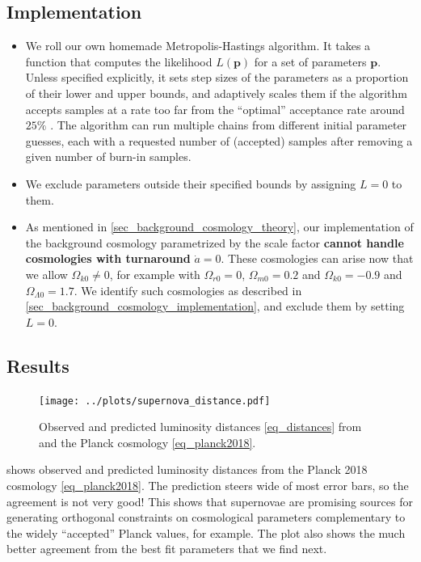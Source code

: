 \documentclass[10pt,a4paper]{article}
\begin{document}
\subsection{Implementation}

\begin{itemize}
	\item We roll our own homemade Metropolis-Hastings algorithm.
	      It takes a function that computes the likelihood $L(\mathbf{p})$ for a set of parameters $\mathbf{p}$.
	      Unless specified explicitly, it sets step sizes of the parameters as a proportion of their lower and upper bounds,
		  and adaptively scales them if the algorithm accepts samples at a rate too far from the ``optimal'' acceptance rate around $25\%$ \cite{gelmanWeakConvergenceOptimal1997}.
		  The algorithm can run multiple chains from different initial parameter guesses,
		  each with a requested number of (accepted) samples after removing a given number of burn-in samples.
	\item We exclude parameters outside their specified bounds by assigning $L=0$ to them.
	\item As mentioned in \cref{sec_background_cosmology_theory},
	      our implementation of the background cosmology parametrized by the scale factor
	      \textbf{cannot handle cosmologies with turnaround} $\dot{a} = 0$.
	      These cosmologies can arise now that we allow $\Omega_{k0} \neq 0$,
	      for example with $\Omega_{r0}=0$, $\Omega_{m0} = 0.2$ and $\Omega_{k0} = -0.9$ and $\Omega_{\Lambda0} = 1.7$.
	      We identify such cosmologies as described in \cref{sec_background_cosmology_implementation}, and exclude them by setting $L=0$.
\end{itemize}

\subsection{Results}

\begin{figure}[!b]
	\centering
	\texttt{[image: ../plots/supernova\_distance.pdf]}
	\caption{Observed and predicted luminosity distances \eqref{eq_distances} from \cite{betouleImprovedCosmologicalConstraints2014} and the Planck cosmology \eqref{eq_planck2018}.}
	\label{fig_luminosity_distances}
\end{figure}

 shows observed and predicted luminosity distances from the Planck 2018 cosmology \eqref{eq_planck2018}.
The prediction steers wide of most error bars, so the agreement is not very good!
This shows that supernovae are promising sources for generating orthogonal constraints on cosmological parameters complementary to the widely ``accepted'' Planck values, for example.
The plot also shows the much better agreement from the best fit parameters that we find next.
\end{document}

